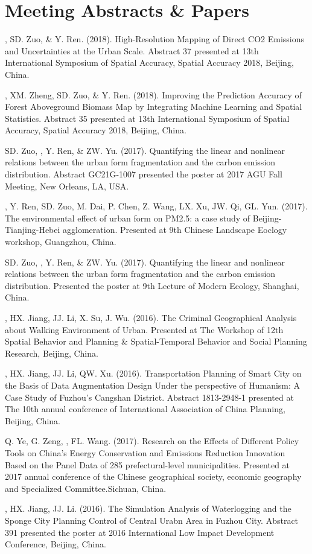 \section*{Meeting Abstracts \& Papers}
\begin{etaremune}
\item
    \Shaoqing, SD. Zuo, \& Y. Ren. (2018).
    High-Resolution Mapping of Direct CO2 Emissions and Uncertainties at the Urban Scale.
    Abstract 37 presented at 13th International Symposium of Spatial Accuracy, Spatial Accuracy 2018, Beijing, China.
\item
    \Shaoqing\CF, XM. Zheng, SD. Zuo, \& Y. Ren. (2018).
    Improving the Prediction Accuracy of Forest Aboveground Biomass Map by Integrating Machine Learning and Spatial Statistics.
    Abstract 35 presented at 13th International Symposium of Spatial Accuracy, Spatial Accuracy 2018, Beijing, China.
\item
    SD. Zuo, \Shaoqing, Y. Ren, \&  ZW. Yu. (2017).
    Quantifying the linear and nonlinear relations between the urban form fragmentation and the carbon emission distribution.
    Abstract GC21G-1007 presented the poster at 2017 AGU Fall Meeting, New Orleans, LA, USA.
\item
    \Shaoqing, Y. Ren, SD. Zuo, M. Dai, P. Chen, Z. Wang, LX. Xu, JW. Qi, GL. Yun. (2017).
    The environmental effect of urban form on PM2.5: a case study of Beijing-Tianjing-Hebei agglomeration.
    Presented at 9th Chinese Landscape Eoclogy workshop, Guangzhou, China.
\item
    SD. Zuo, \Shaoqing, Y. Ren, \&  ZW. Yu. (2017).
    Quantifying the linear and nonlinear relations between the urban form fragmentation and the carbon emission distribution.
    Presented the poster at 9th Lecture of Modern Ecology, Shanghai, China.
\item
    \Shaoqing, HX. Jiang, JJ. Li, X. Su, J. Wu. (2016).
    The Criminal Geographical Analysis about Walking Environment of Urban.
    Presented at The Workshop of 12th Spatial Behavior and Planning \& Spatial-Temporal Behavior and Social Planning Research, Beijing, China.
\item
    \Shaoqing, HX. Jiang, JJ. Li, QW. Xu. (2016).
    Transportation Planning of Smart City on the Basis of Data Augmentation Design Under the perspective of Humanism: A Case Study of Fuzhou’s Cangshan District.
    Abstract 1813-2948-1 presented at The 10th annual conference of International Association of China Planning, Beijing, China.
\item
    Q. Ye, G. Zeng, \Shaoqing, FL. Wang. (2017).
     Research on the Effects of Different Policy Tools on China’s Energy Conservation and Emissions Reduction Innovation Based on the Panel Data of 285 prefectural-level municipalities.
     Presented at 2017 annual conference of the Chinese geographical society, economic geography and Specialized Committee.Sichuan, China.
\item
    \Shaoqing, HX. Jiang, JJ. Li. (2016).
    The Simulation Analysis of Waterlogging and the Sponge City Planning Control of Central Urabn Area in Fuzhou City.
    Abstract 391 presented the poster at 2016 International Low Impact Development Conference, Beijing, China.
\end{etaremune}

